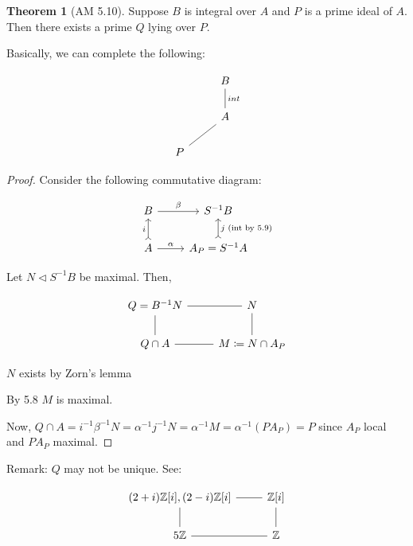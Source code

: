 \documentclass{article}
\theoremstyle{definition}
\newtheorem{theorem}{Theorem}
\begin{document}
\begin{theorem}
    [AM 5.10]

    Suppose \(B\) is integral over \(A\) and \(P\) is a prime ideal of \(A\). Then there exists a prime \(Q\) lying over \(P\).

    Basically, we can complete the following:

    \[
        \begin{tikzcd}
            & B \\
            & A \ar[u, no head, "int", swap]\\
            P \ar[ur, no head] & 
        \end{tikzcd}
    \]
\end{theorem}

\begin{proof}
    Consider the following commutative diagram:

    \[
        \begin{tikzcd}
            B \ar[r, "\beta"] & S ^{-1} B \\
            A \ar[u, "i", tail] \ar[r, "\alpha"] & A_P = S ^{-1} A \ar[u, "j \text{ (int by 5.9)} ", tail, swap]
        \end{tikzcd}
    \]

    Let \(N \triangleleft S ^{-1} B\) be maximal. Then,
    
    \[
        \begin{tikzcd}
            Q = B ^{-1} N \ar[r, no head] & N \\
            Q \cap A \ar[u, no head] \ar[r, no head] & M \coloneqq N \cap A_P \ar[u, no head]
        \end{tikzcd}
    \]

    \(N\) exists by Zorn's lemma

    By 5.8 \(M\) is maximal.

    Now, \(Q\cap A = i ^{-1} \beta ^{-1} N = \alpha ^{-1} j ^{-1} N = \alpha ^{-1} M = \alpha ^{-1} (P A_P) = P\) since \(A_P\) local and \(PA_P\) maximal.

\end{proof}

Remark: \(Q\) may not be unique. See:

\[
    \begin{tikzcd}
        (2+i)\mathbb{Z}[i], (2-i)\mathbb{Z}[i] \ar[r, no head] & \mathbb{Z} [i]\\
        5\mathbb{Z} \ar[u, no head] \ar[r, no head] & \mathbb{Z} \ar[u, no head]
    \end{tikzcd}
\]
\end{document}
